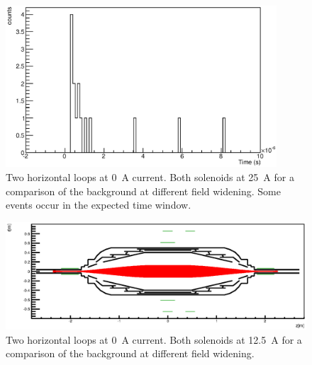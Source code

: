 \begin{figure}
\centering
	\includegraphics[width = 0.9\textwidth]{graphics/analysis/monSpec/NA.eps}
	\caption[\SI{0}{\ampere} loops analysis]{Two horizontal loops at \SI{0}{\ampere} current. Both solenoids at \SI{25}{\ampere} for a comparison of the background at different field widening. Some events occur in the expected time window.}
	\label{fig:NA}
\end{figure}
\clearpage



\begin{figure}
\centering
	\centerline{\includegraphics[width = 1.3\linewidth]{graphics/analysis/monSpec/fieldSimulation/NI.eps} }
	
	\caption[\SI{0}{\ampere} loops]{Two horizontal loops at \SI{0}{\ampere} current. Both solenoids at \SI{12.5}{\ampere} for a comparison of the background at different field widening. }
	\label{fig:NIf}
\end{figure}

